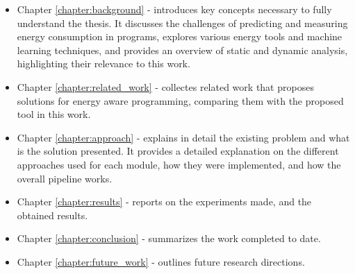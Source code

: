 \begin{itemize}
\item Chapter \ref{chapter:background} - introduces key concepts necessary to fully understand the thesis. It discusses the challenges of predicting and measuring energy consumption in programs, explores various energy tools and machine learning techniques, and provides an overview of static and dynamic analysis, highlighting their relevance to this work.

\item Chapter \ref{chapter:related_work} - collectes related work that proposes solutions for energy aware programming, comparing them with the proposed tool in this work.

\item Chapter \ref{chapter:approach} - explains in detail the existing problem and what is the solution presented. It provides a detailed explanation on the different approaches used for each module, how they were implemented, and how the overall pipeline works.

\item Chapter \ref{chapter:results} - reports on the experiments made, and the obtained results.

\item Chapter \ref{chapter:conclusion} - summarizes the work completed to date.

\item Chapter \ref{chapter:future_work} - outlines future research directions.

\end{itemize}